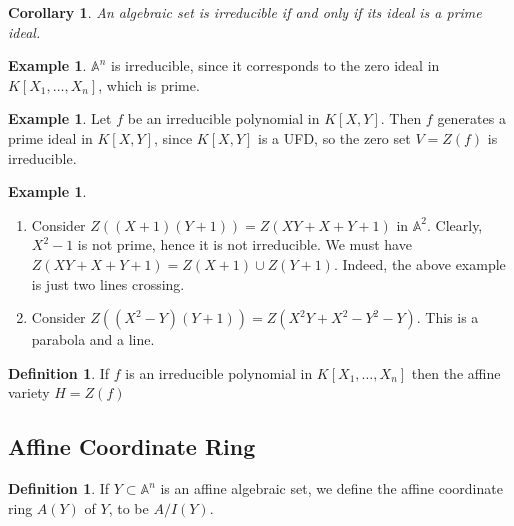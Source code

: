 \documentclass[11pt]{book}
\newtheorem{corollary}[theorem]{Corollary}
\theoremstyle{definition}
\newtheorem{definition}[theorem]{Definition}
\newtheorem{example}[theorem]{Example}
\numberwithin{equation}{section}
\begin{document}
\begin{thmbox}
    \begin{corollary}
        \label{cor:ideal_correspondence}
        An algebraic set is irreducible if and only if its ideal is a prime ideal.
    \end{corollary}
\end{thmbox}
\begin{exmbox}
    \begin{example}
        \(\mathbb{A}^n\) is irreducible, since it corresponds to the zero ideal in \(K[X_1, \ldots, X_n]\), which is prime.
    \end{example}
\end{exmbox}
\begin{example}
    Let \(f\) be an irreducible polynomial in \(K[X, Y]\). Then \(f\) generates a prime ideal in \(K[X, Y]\), since \(K[X, Y]\) is a UFD, so the zero set \(V = Z(f)\) is irreducible.
\end{example}


\begin{example}
    \begin{enumerate}
        \item Consider \(Z((X + 1)(Y + 1)) = Z(XY + X + Y + 1)\) in \(\mathbb{A}^2\). Clearly, \(X^2 - 1\) is not prime, hence it is not irreducible. We must have \(Z(XY + X + Y + 1) = Z(X + 1) \cup Z(Y + 1)\). Indeed, the above example is just two lines crossing.
        \item Consider \(Z((X^2 - Y)(Y + 1)) = Z(X^2Y + X^2 - Y^2 - Y)\). This is a parabola and a line.
    \end{enumerate}


\end{example}

\begin{defbox}
    \begin{definition}
        If \(f\) is an irreducible polynomial in \(K[X_1, \ldots, X_n]\) then the affine variety \(H = Z(f)\)
    \end{definition}
\end{defbox}

\newpage
\subsection*{Affine Coordinate Ring}

\begin{defbox}
    \begin{definition}
        \label{def:affine_coordinate_ring}
        If \(Y \subset \mathbb{A}^n\) is an affine algebraic set, we define the affine coordinate ring \(A(Y)\) of \(Y\), to be \(A / I(Y)\). 
    \end{definition}
\end{defbox}
\end{document}
